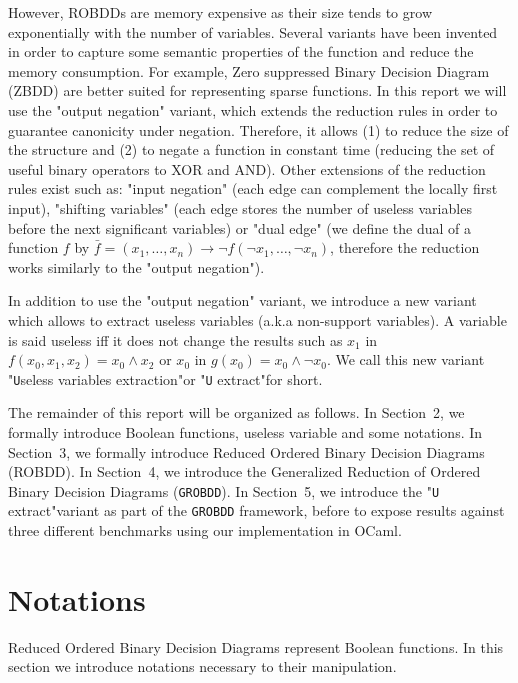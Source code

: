\documentclass[a4paper,10pt]{article}
\newcommand{\Uextract}{"\texttt{U}seless variables extraction"}
\newcommand{\uextract}{"\texttt{U} extract"}
\newcommand{\GroBdd}{\texttt{GROBDD}}
\begin{document}
However, ROBDDs are memory expensive as their size tends to grow exponentially with the number of variables.
Several variants have been invented in order to capture some semantic properties of the function and reduce the memory consumption.
For example, Zero suppressed Binary Decision Diagram (ZBDD) are better suited for representing sparse functions.
In this report we will use the "output negation" variant\cite{BryantVariantN}, which extends the reduction rules in order to guarantee canonicity under negation.
Therefore, it allows (1) to reduce the size of the structure and (2) to negate a function in constant time (reducing the set of useful binary operators to XOR and AND).
Other extensions of the reduction rules exist such as: "input negation"\cite{MinatoVariants} (each edge can complement the locally first input), "shifting variables"\cite{MinatoVariants} (each edge stores the number of useless variables before the next significant variables) or "dual edge"\cite{RolfVariantDual} (we define the dual of a function $f$ by $\bar{f} = (x_1, \dots, x_n) \longrightarrow \lnot f(\lnot x_1, \dots, \lnot x_n)$, therefore the reduction works similarly to the "output negation").


In addition to use the "output negation" variant, we introduce a new variant which allows to extract useless variables (a.k.a non-support variables).
A variable is said useless iff it does not change the results such as $x_1$ in $f(x_0, x_1, x_2) = x_0 \land x_2$ or $x_0$ in $g(x_0) = x_0 \land \lnot x_0$.
We call this new variant \Uextract or \uextract for short.

The remainder of this report will be organized as follows.
In Section~2, we formally introduce Boolean functions, useless variable and some notations.
In Section~3, we formally introduce Reduced Ordered Binary Decision Diagrams (ROBDD).
In Section~4, we introduce the Generalized Reduction of Ordered Binary Decision Diagrams (\GroBdd{}).
In Section~5, we introduce the \uextract variant as part of the \GroBdd{} framework, before to expose results against three  different benchmarks \cite{BenchSatlib, BenchLgsynth91, BenchIscas99} using our implementation in OCaml.

\section{Notations}

Reduced Ordered Binary Decision Diagrams represent Boolean functions.
In this section we introduce notations necessary to their manipulation.
\end{document}
